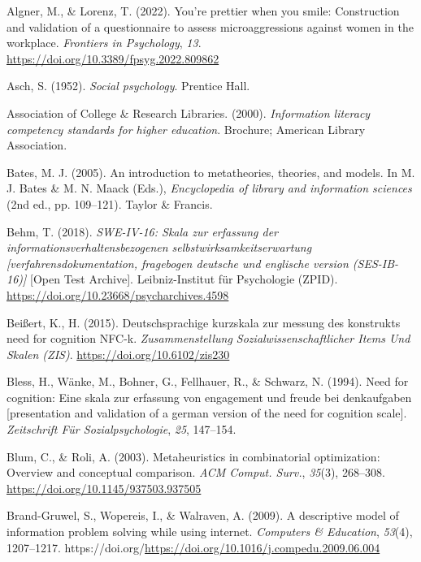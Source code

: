 \documentclass[
  12pt,
  a4paper,
  twoside]{article}
\newlength{\cslhangindent}
\newenvironment{CSLReferences}[2] %
 {\begin{list}{}{%
  \setlength{\itemindent}{0pt}
  \setlength{\leftmargin}{0pt}
  \setlength{\parsep}{0pt}
  \ifodd #1
   \setlength{\leftmargin}{\cslhangindent}
   \setlength{\itemindent}{-1\cslhangindent}
  \fi
  \setlength{\itemsep}{#2\baselineskip}}}
 {\end{list}}
\begin{document}
\label{refs}
\begin{CSLReferences}{1}{0}
Algner, M., \& Lorenz, T. (2022). You're prettier when you smile: Construction and validation of a questionnaire to assess microaggressions against women in the workplace. \emph{Frontiers in Psychology}, \emph{13}. \url{https://doi.org/10.3389/fpsyg.2022.809862}

Asch, S. (1952). \emph{Social psychology}. Prentice Hall.

Association of College \& Research Libraries. (2000). \emph{Information literacy competency standards for higher education}. Brochure; American Library Association.

Bates, M. J. (2005). An introduction to metatheories, theories, and models. In M. J. Bates \& M. N. Maack (Eds.), \emph{Encyclopedia of library and information sciences} (2nd ed., pp. 109--121). Taylor \& Francis.

Behm, T. (2018). \emph{SWE-IV-16: Skala zur erfassung der informationsverhaltensbezogenen selbstwirksamkeitserwartung {[}verfahrensdokumentation, fragebogen deutsche und englische version (SES-IB-16){]}} {[}Open Test Archive{]}. Leibniz-Institut für Psychologie (ZPID). \url{https://doi.org/10.23668/psycharchives.4598}

Beißert, K., H. (2015). Deutschsprachige kurzskala zur messung des konstrukts need for cognition NFC-k. \emph{Zusammenstellung Sozialwissenschaftlicher Items Und Skalen (ZIS)}. \url{https://doi.org/10.6102/zis230}

Bless, H., Wänke, M., Bohner, G., Fellhauer, R., \& Schwarz, N. (1994). Need for cognition: Eine skala zur erfassung von engagement und freude bei denkaufgaben {[}presentation and validation of a german version of the need for cognition scale{]}. \emph{Zeitschrift Für Sozialpsychologie}, \emph{25}, 147--154.

Blum, C., \& Roli, A. (2003). Metaheuristics in combinatorial optimization: Overview and conceptual comparison. \emph{ACM Comput. Surv.}, \emph{35}(3), 268--308. \url{https://doi.org/10.1145/937503.937505}

Brand-Gruwel, S., Wopereis, I., \& Walraven, A. (2009). A descriptive model of information problem solving while using internet. \emph{Computers \& Education}, \emph{53}(4), 1207--1217. https://doi.org/\url{https://doi.org/10.1016/j.compedu.2009.06.004}


\end{CSLReferences}
\end{document}
